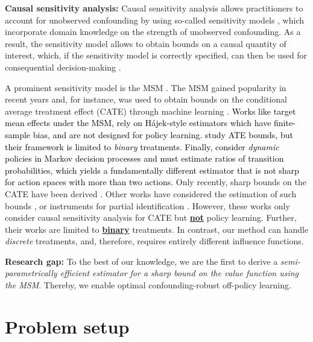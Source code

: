 \documentclass{article} %
\theoremstyle{plain}
\theoremstyle{definition}
\theoremstyle{remark}
\newcommand{\rebuttal}[1]{\textcolor{black}{#1}}
\begin{document}


\textbf{Causal sensitivity analysis:} Causal sensitivity analysis \citep{Cornfield.1959} allows practitioners to account for unobserved confounding by using so-called sensitivity models \citep{Jin.2022,Rosenbaum.1987}, which incorporate domain knowledge on the strength of unobserved confounding. As a result, the sensitivity model allows to obtain bounds on a causal quantity of interest, which, if the sensitivity model is correctly specified, can then be used for consequential decision-making  \citep{Jesson.2021}. 

A prominent sensitivity model is the MSM \citep{Tan.2006}. The MSM gained popularity in recent years and, for instance, was used to obtain bounds on the conditional average treatment effect (CATE) through machine learning \citep{Jesson.2021, Kallus.2019, Yin.2022}. \rebuttal{Works like \citet{Aronow.2013, Miratrix.2018, Zhao.2019} target mean effects under the MSM, rely on Hájek-style estimators which have finite-sample bias, and are not designed for policy learning. \citet{Yadlowsky.2018} study ATE bounds, but their framework is limited to \emph{binary} treatments. Finally, \citet{Bruns-Smith.2023} consider \emph{dynamic} policies in Markov decision processes and must estimate ratios of transition probabilities, which yields a fundamentally different estimator that is not sharp for action spaces with more than two actions.} Only recently, sharp bounds on the CATE have been derived \citep{Bonvini.2022, Dorn.2022, Frauen.2024b, Frauen.2023c, Jin.2023}. Other works have considered the estimation of such bounds \citep{Dorn.2024, Oprescu.2023}, or instruments for partial identification \cite{Schweisthal.2025}. However, these works only consider causal sensitivity analysis for CATE but \textbf{\underline{not}} policy learning. 
Further, their works are limited to \textbf{\underline{binary}} treatments. In contrast, our method can handle \emph{discrete} treatments, and, therefore, requires entirely different influence functions. %

\textbf{Research gap:} To the best of our knowledge, we are the first to derive a \emph{semi-parametrically efficient estimator for a sharp bound on the value function using the MSM}. Thereby, we enable optimal confounding-robust off-policy learning.



\section{Problem setup}\label{sec:setup} 
\end{document}

